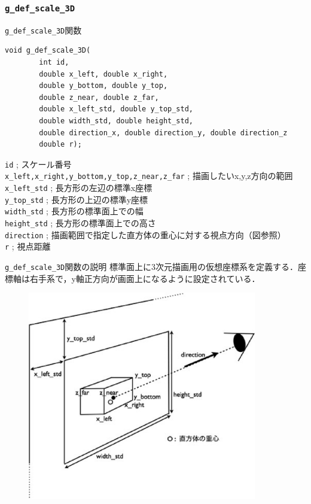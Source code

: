 \documentclass[platex,a4paper,12pt]{jsarticle}%
\begin{document}
\clearpage
\subsubsection{\texttt{g\_def\_scale\_3D}}

\begin{itembox}[l]{\texttt{g\_def\_scale\_3D}関数}
\begin{verbatim}
void g_def_scale_3D(
        int id,
        double x_left, double x_right,
        double y_bottom, double y_top,
        double z_near, double z_far,
        double x_left_std, double y_top_std,
        double width_std, double height_std,
        double direction_x, double direction_y, double direction_z
        double r);
\end{verbatim}
\verb|id| ; スケール番号\\
\verb|x_left,x_right,y_bottom,y_top,z_near,z_far| ; 描画したいx,y,z方向の範囲\\
\verb|x_left_std| ; 長方形の左辺の標準x座標\\
\verb|y_top_std| ; 長方形の上辺の標準y座標\\
\verb|width_std| ; 長方形の標準面上での幅\\
\verb|height_std| ; 長方形の標準面上での高さ\\
\verb|direction| ; 描画範囲で指定した直方体の重心に対する視点方向（図参照）\\
\verb|r| ; 視点距離 
\end{itembox}

\begin{itembox}[l]{\texttt{g\_def\_scale\_3D}関数の説明}
標準面上に3次元描画用の仮想座標系を定義する．座標軸は右手系で，y軸正方向が画面上になるように設定されている．
\end{itembox}

\begin{figure}[htb]
	\includegraphics[width=100mm]{./Figures/eps/Canvas_g_def_scale_3D.eps}
\end{figure}
\end{document}
